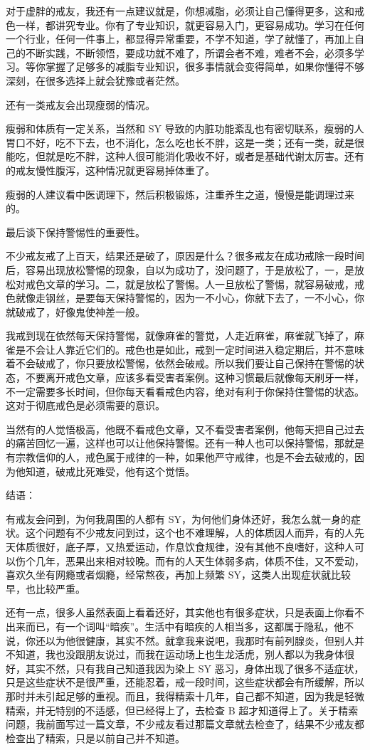\documentclass[fontset=founder]{ctexart}
\begin{document}
对于虚胖的戒友，我还有一点建议就是，你想减脂，必须让自己懂得更多，这和戒色一样，都讲究专业。你有了专业知识，就更容易入门，更容易成功。学习在任何一个行业，任何一件事上，都显得异常重要，不学不知道，学了就懂了，再加上自己的不断实践，不断领悟，要成功就不难了，所谓会者不难，难者不会，必须多学习。等你掌握了足够多的减脂专业知识，很多事情就会变得简单，如果你懂得不够深刻，在很多选择上就会犹豫或者茫然。

还有一类戒友会出现瘦弱的情况。

瘦弱和体质有一定关系，当然和 SY 导致的内脏功能紊乱也有密切联系，瘦弱的人胃口不好，吃不下去，也不消化，怎么吃也长不胖，这是一类；还有一类，就是很能吃，但就是吃不胖，这种人很可能消化吸收不好，或者是基础代谢太厉害。还有的戒友慢性腹泻，这种情况就更容易掉体重了。

瘦弱的人建议看中医调理下，然后积极锻炼，注重养生之道，慢慢是能调理过来的。

最后谈下保持警惕性的重要性。

不少戒友戒了上百天，结果还是破了，原因是什么？很多戒友在成功戒除一段时间后，容易出现放松警惕的现象，自以为成功了，没问题了，于是放松了，一，是放松对戒色文章的学习。二，就是放松了警惕。人一旦放松了警惕，就容易破戒，戒色就像走钢丝，是要每天保持警惕的，因为一不小心，你就下去了，一不小心，你就破戒了，好像鬼使神差一般。

我戒到现在依然每天保持警惕，就像麻雀的警觉，人走近麻雀，麻雀就飞掉了，麻雀是不会让人靠近它们的。戒色也是如此，戒到一定时间进入稳定期后，并不意味着不会破戒了，你只要放松警惕，依然会破戒。所以我们要让自己保持在警惕的状态，不要离开戒色文章，应该多看受害者案例。这种习惯最后就像每天刷牙一样，不一定需要多长时间，但你每天看看戒色内容，绝对有利于你保持住警惕的状态。这对于彻底戒色是必须需要的意识。

当然有的人觉悟极高，他既不看戒色文章，又不看受害者案例，他每天把自己过去的痛苦回忆一遍，这样也可以让他保持警惕。还有一种人也可以保持警惕，那就是有宗教信仰的人，戒色属于戒律的一种，如果他严守戒律，也是不会去破戒的，因为他知道，破戒比死难受，他有这个觉悟。

结语：

有戒友会问到，为何我周围的人都有 SY，为何他们身体还好，我怎么就一身的症状。这个问题有不少戒友问到过，这个也不难理解，人的体质因人而异，有的人先天体质很好，底子厚，又热爱运动，作息饮食规律，没有其他不良嗜好，这种人可以伤个几年，恶果出来相对较晚。而有的人天生体弱多病，体质不佳，又不爱动，喜欢久坐有网瘾或者烟瘾，经常熬夜，再加上频繁 SY，这类人出现症状就比较早，也比较严重。

还有一点，很多人虽然表面上看着还好，其实他也有很多症状，只是表面上你看不出来而已，有一个词叫“暗疾”。生活中有暗疾的人相当多，这都属于隐私，他不说，你还以为他很健康，其实不然。就拿我来说吧，我那时有前列腺炎，但别人并不知道，我也没跟朋友说过，而我在运动场上也生龙活虎，别人都以为我身体很好，其实不然，只有我自己知道我因为染上 SY 恶习，身体出现了很多不适症状，只是这些症状不是很严重，还能忍着，戒一段时间，这些症状都会有所缓解，所以那时并未引起足够的重视。而且，我得精索十几年，自己都不知道，因为我是轻微精索，并无特别的不适感，但已经得上了，去检查 B 超才知道得上了。关于精索问题，我前面写过一篇文章，不少戒友看过那篇文章就去检查了，结果不少戒友都检查出了精索，只是以前自己并不知道。
\end{document}
